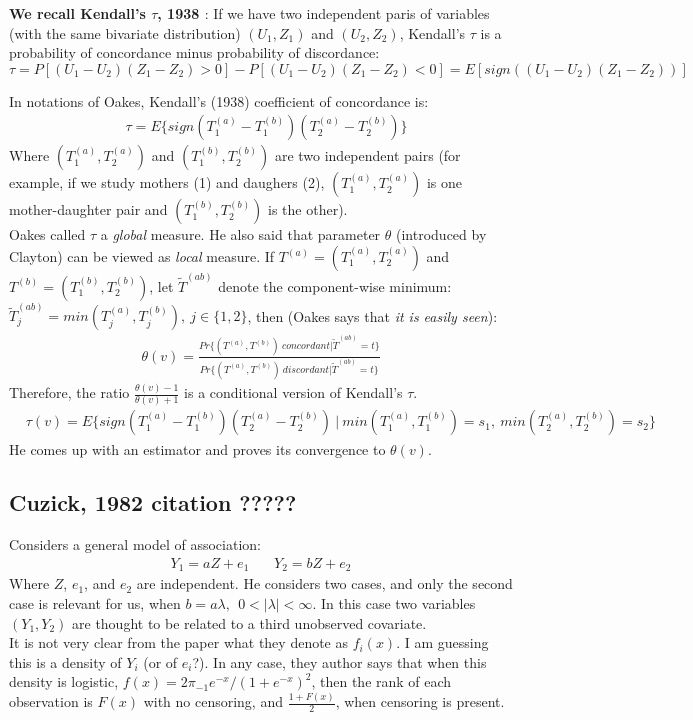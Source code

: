 \documentclass[]{article}
\begin{document}
	
{\tiny{\textbf{We recall Kendall's $\tau$, 1938 \cite{kendall1938new}}: If we have two independent paris of variables (with the same bivariate distribution) $(U_1, Z_1)$ and $(U_2, Z_2)$, Kendall's $\tau$ is a probability of concordance minus probability of discordance:
$\tau = P[(U_1 - U_2)(Z_1 - Z_2)>0] - P[(U_1 - U_2)(Z_1 - Z_2)<0] = E[sign((U_1 - U_2)(Z_1 - Z_2))]$}}

 
In notations of Oakes, Kendall's (1938) coefficient of concordance is:
	$$
	\begin{aligned}
		&\tau = E\{sign(T_{1}^{(a)} - T_{1}^{(b)}) (T_{2}^{(a)} - T_{2}^{(b)}) \}
	\end{aligned}
	$$
	Where $(T_1^{(a)}, T_2^{(a)})$ and $(T_1^{(b)}, T_2^{(b)})$ are two independent pairs (for example, if we study mothers (1) and daughers (2), $(T_1^{(a)}, T_2^{(a)})$ is one mother-daughter pair and $(T_1^{(b)}, T_2^{(b)})$ is the other).\\

 Oakes called $\tau$ a \emph{global} measure. He also said that parameter $\theta$ (introduced by Clayton) can be viewed as \emph{local} measure. If $T^{(a)}=(T_1^{(a)}, T_2^{(a)})$ and $T^{(b)} = (T_1^{(b)}, T_2^{(b)})$, let $\tilde{T}^{(ab)}$ denote the component-wise minimum: $\tilde{T}^{(ab)}_j = min(T^{(a)}_j, T^{(b)}_j),~j\in\{1,2\}$, then (Oakes says that \emph{it is easily seen}):
	$$
	\begin{aligned}
		\theta(v) = \frac{Pr\{(T^{(a)}, T^{(b)})~concordant|\tilde{T}^{(ab)}=t\} }{  Pr\{(T^{(a)}, T^{(b)})~discordant|\tilde{T}^{(ab)}=t\}}
 	\end{aligned}
	$$
Therefore, the ratio $\frac{\theta(v)-1}{\theta(v)+1}$ is a conditional version of Kendall's $\tau$.
	$$
	\begin{aligned}
		&\tau(v) = E\{sign(T_{1}^{(a)} - T_{1}^{(b)}) (T_{2}^{(a)} - T_{2}^{(b)}) ~|~ min(T^{(a)}_1, T^{(b)}_1) = s_1,~min(T^{(a)}_2, T^{(b)}_2) = s_2  \}
	\end{aligned}
	$$
He comes up with an estimator and proves its convergence to $\theta(v)$.

\subsection{Cuzick, 1982 citation ?????}
Considers a general model of association:
	$$
	\begin{aligned}
		Y_1 = aZ + e_1 ~~~~~~~~ Y_2 = bZ + e_2
	\end{aligned}
	$$
Where $Z$, $e_1$, and $e_2$ are independent. He considers two cases, and only the second case is relevant for us, when $b=a\lambda,~~0<|\lambda|<\infty$. In this case two variables $(Y_1, Y_2)$ are thought to be related to a third unobserved covariate.\\
It is not very clear from the paper what they denote as $f_i(x)$. I am guessing this is a density of $Y_i$ (or of $e_i$?). In any case, they author says that when this density is logistic, $f(x) = 2\pi_{-1} e^{-x}/(1+e^{-x})^2$, then the rank of each observation is $F(x)$ with no censoring, and $\frac{1+F(x)}{2}$, when censoring is present.
\end{document}
